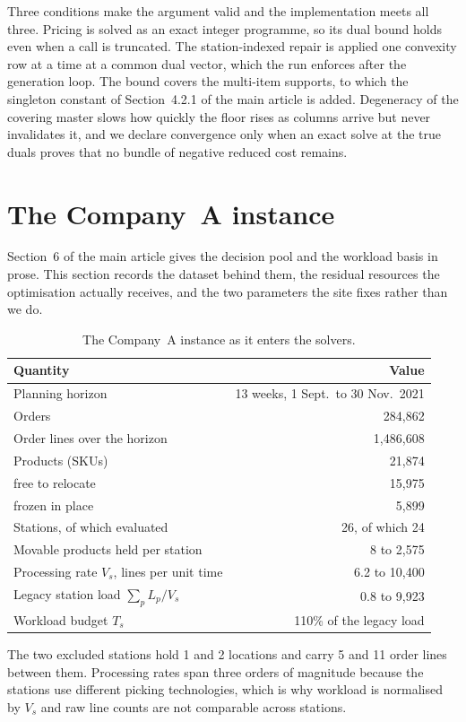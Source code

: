 \documentclass[11pt]{article}
\newcommand{\tbl}[1]{\caption{#1}}
\newcommand{\tabnote}[1]{\vspace{2pt}\footnotesize\raggedright #1\par}
\begin{document}
Three conditions make the argument valid and the implementation meets all three. Pricing is solved
as an exact integer programme, so its dual bound holds even when a call is truncated. The
station-indexed repair is applied one convexity row at a time at a common dual vector, which the
run enforces after the generation loop. The bound covers the multi-item supports, to which the
singleton constant of Section~4.2.1 of the main article is added. Degeneracy of the covering master
slows how quickly the floor rises as columns arrive but never invalidates it, and we declare
convergence only when an exact solve at the true duals proves that no bundle of negative reduced
cost remains.

\section{The Company~A instance}\label{sup:instance}
Section~6 of the main article gives the decision pool and the workload basis in prose. This section
records the dataset behind them, the residual resources the optimisation actually receives, and the
two parameters the site fixes rather than we do.

\begin{table}[H]
\centering
\tbl{The Company~A instance as it enters the solvers.}
{\small\begin{tabular*}{\textwidth}{@{\extracolsep{\fill}}lr@{}}
\toprule
Quantity & Value \\
\midrule
Planning horizon & 13 weeks, 1 Sept.\ to 30 Nov.\ 2021 \\
Orders & 284{,}862 \\
Order lines over the horizon & 1{,}486{,}608 \\
Products (SKUs) & 21{,}874 \\
\quad free to relocate & 15{,}975 \\
\quad frozen in place & 5{,}899 \\
Stations, of which evaluated & 26, of which 24 \\
Movable products held per station & 8 to 2{,}575 \\
Processing rate $V_s$, lines per unit time & 6.2 to 10{,}400 \\
Legacy station load $\sum_{p} L_p/V_s$ & 0.8 to 9{,}923 \\
Workload budget $T_s$ & 110\% of the legacy load \\
\bottomrule
\end{tabular*}}
\tabnote{The two excluded stations hold 1 and 2 locations and carry 5 and 11 order lines between them. Processing rates span three orders of magnitude because the stations use different picking technologies, which is why workload is normalised by $V_s$ and raw line counts are not comparable across stations.}
\label{tab:instance}
\end{table}
\end{document}
